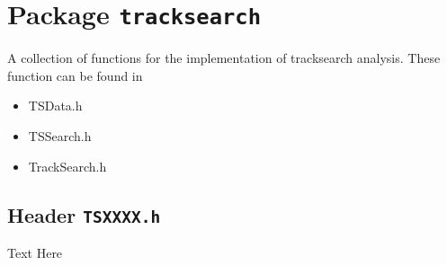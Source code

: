 \chapter{Package \texttt{tracksearch}}

A collection of functions for the implementation of tracksearch
analysis. These function can be found in
\begin{itemize}
\item TSData.h  
\item TSSearch.h
\item TrackSearch.h  
\end{itemize}

\newpage

\newpage

\section{Header \texttt{TSXXXX.h}}
\label{s:TSXXXX.h}

Text Here


